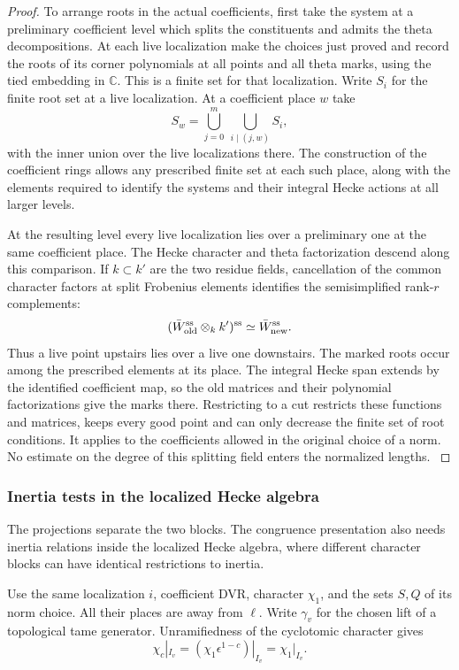 \begin{proof}
To arrange roots in the actual coefficients, first take the
system at a preliminary coefficient level which splits the
constituents and admits the theta decompositions. At each live
localization make the choices just proved and record the roots
of its corner polynomials at all points and all theta marks,
using the tied embedding in \(\mathbb C\). This is a finite set
for that localization. Write \(S_i\) for the finite root set at a live localization. At a coefficient place \(w\) take
\[
 S_w=\bigcup_{j=0}^{m}\ \bigcup_{i\mid(j,w)}S_i,
\]
with the inner union over the live localizations there. The construction of the coefficient rings
allows any prescribed finite set at each such place, along
with the elements required to identify the systems and
their integral Hecke actions at all larger levels.

At the resulting level every live localization lies over
a preliminary one at the same coefficient place. The Hecke
character and theta factorization descend along this
comparison. If \(k\subset k'\) are the two residue fields, cancellation of the common character factors at split Frobenius elements identifies the semisimplified rank-\(r\) complements:
\[
 (\bar W_{\rm old}^{\rm ss}\otimes_k k')^{\rm ss}\simeq \bar W_{\rm new}^{\rm ss}.
\]
Thus a live point upstairs lies over a live one downstairs. The marked roots occur among
the prescribed elements at its place. The integral Hecke
span extends by the identified coefficient map, so the
old matrices and their polynomial factorizations give the
marks there. Restricting to a cut restricts these functions
and matrices, keeps every good point and can only decrease
the finite set of root conditions.  It applies to the coefficients allowed
in the original choice of a norm. No estimate on the degree
of this splitting field enters the normalized lengths.
\label{cor:retained-galois-3}
\end{proof}

\subsubsection*{Inertia tests in the localized Hecke algebra}

The projections separate the two blocks. The congruence presentation also needs inertia relations inside the localized Hecke algebra, where different character blocks can have identical restrictions to inertia.

Use the same localization \(i\), coefficient DVR, character
\(\chi_1\), and the sets \(S,Q\) of its norm choice. All their
places are away from \(\ell\). Write \(\gamma_v\) for the
chosen lift of a topological tame generator. Unramifiedness of the cyclotomic character gives
\[
 \chi_c|_{I_v}=(\chi_1\epsilon^{1-c})|_{I_v}=\chi_1|_{I_v}.
\]

